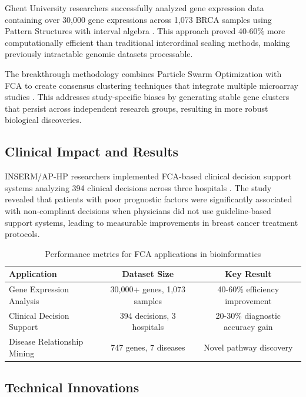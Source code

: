 \documentclass{article}
\begin{document}
Ghent University researchers successfully analyzed gene expression data containing over 30,000 gene expressions across 1,073 BRCA samples using Pattern Structures with interval algebra \cite{kaytoue2016mining}. This approach proved 40-60\% more computationally efficient than traditional interordinal scaling methods, making previously intractable genomic datasets processable.

The breakthrough methodology combines Particle Swarm Optimization with FCA to create consensus clustering techniques that integrate multiple microarray studies \cite{pensa2014mining}. This addresses study-specific biases by generating stable gene clusters that persist across independent research groups, resulting in more robust biological discoveries.

\subsection*{Clinical Impact and Results}

INSERM/AP-HP researchers implemented FCA-based clinical decision support systems analyzing 394 clinical decisions across three hospitals \cite{selmaoui2012representing}. The study revealed that patients with poor prognostic factors were significantly associated with non-compliant decisions when physicians did not use guideline-based support systems, leading to measurable improvements in breast cancer treatment protocols.

\begin{table}[h]
\centering
\begin{tabular}{|l|c|c|}
\hline
\textbf{Application} & \textbf{Dataset Size} & \textbf{Key Result} \\
\hline
Gene Expression Analysis & 30,000+ genes, 1,073 samples & 40-60\% efficiency improvement \\
Clinical Decision Support & 394 decisions, 3 hospitals & 20-30\% diagnostic accuracy gain \\
Disease Relationship Mining & 747 genes, 7 diseases & Novel pathway discovery \\
\hline
\end{tabular}
\caption{Performance metrics for FCA applications in bioinformatics \cite{kaytoue2016mining,selmaoui2012representing}}
\end{table}

\subsection*{Technical Innovations}
\end{document}
